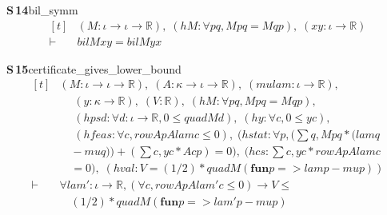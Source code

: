 \documentclass[conference]{IEEEtran}
\theoremstyle{definition}
\newcommand{\lean}[1]{\textsf{\footnotesize #1}}
\begin{document}
\noindent\textbf{S\,14}\quad\lean{bil\_symm}
{\footnotesize\[ \begin{aligned}[t]
&(\mathit{M} : \iota \to \iota \to \mathbb{R} ),\; (\mathit{hM} : \forall \mathit{p} \mathit{q}, \mathit{M} \mathit{p} \mathit{q} = \mathit{M} \mathit{q} \mathit{p}),\; (\mathit{x} \mathit{y} : \iota \to \mathbb{R} )\\
\vdash\;&\mathit{bil} \mathit{M} \mathit{x} \mathit{y} = \mathit{bil} \mathit{M} \mathit{y} \mathit{x}
\end{aligned} \]}

\noindent\textbf{S\,15}\quad\lean{certificate\_gives\_lower\_bound}
{\footnotesize\[ \begin{aligned}[t]
&(\mathit{M} : \iota \to \iota \to \mathbb{R} ),\; (\mathit{A} : \kappa \to \iota \to \mathbb{R} ),\; (\mathit{mu} \mathit{lam} : \iota \to \mathbb{R} ),\\
&\quad \; (\mathit{y} : \kappa \to \mathbb{R} ),\; (\mathit{V} : \mathbb{R} ),\; (\mathit{hM} : \forall \mathit{p} \mathit{q}, \mathit{M} \mathit{p} \mathit{q} = \mathit{M} \mathit{q} \mathit{p}),\\
&\quad \; (\mathit{hpsd} : \forall \mathit{d} : \iota \to \mathbb{R} , 0 \leq \mathit{quad} \mathit{M} \mathit{d}),\; (\mathit{hy} : \forall \mathit{c}, 0 \leq \mathit{y} \mathit{c}),\\
&\quad \; (\mathit{hfeas} : \forall \mathit{c}, \mathit{rowAp} \mathit{A} \mathit{lam} \mathit{c} \leq 0),\; (\mathit{hstat} : \forall \mathit{p}, (\textstyle\sum \mathit{q}, \mathit{M} \mathit{p} \mathit{q} * (\mathit{lam} \mathit{q}\\
&\quad - \mathit{mu} \mathit{q})) + (\textstyle\sum \mathit{c}, \mathit{y} \mathit{c} * \mathit{A} \mathit{c} \mathit{p}) = 0),\; (\mathit{hcs} : \textstyle\sum \mathit{c}, \mathit{y} \mathit{c} * \mathit{rowAp} \mathit{A} \mathit{lam} \mathit{c}\\
&\quad = 0),\; (\mathit{hval} : \mathit{V} = (1/2) * \mathit{quad} \mathit{M} (\mathbf{fun} \mathit{p} => \mathit{lam} \mathit{p} - \mathit{mu} \mathit{p}))\\
\vdash\;&\forall \mathit{lam'} : \iota \to \mathbb{R} , (\forall \mathit{c}, \mathit{rowAp} \mathit{A} \mathit{lam'} \mathit{c} \leq 0) \to \mathit{V} \leq\\
&\quad (1/2) * \mathit{quad} \mathit{M} (\mathbf{fun} \mathit{p} => \mathit{lam'} \mathit{p} - \mathit{mu} \mathit{p})
\end{aligned} \]}
\end{document}
